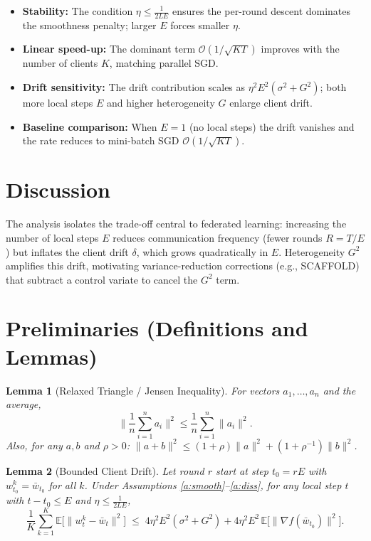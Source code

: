 \documentclass[11pt]{article}
\newtheorem{lemma}{Lemma}
\begin{document}
\begin{itemize}
\item \textbf{Stability:} The condition $\eta \le \tfrac{1}{2LE}$ ensures the
      per-round descent dominates the smoothness penalty; larger $E$ forces
      smaller $\eta$.
\item \textbf{Linear speed-up:} The dominant term $\mathcal{O}(1/\sqrt{KT})$
      improves with the number of clients $K$, matching parallel SGD.
\item \textbf{Drift sensitivity:} The drift contribution scales as
      $\eta^2 E^2 (\sigma^2 + G^2)$; both more local steps $E$ and higher
      heterogeneity $G$ enlarge client drift.
\item \textbf{Baseline comparison:} When $E=1$ (no local steps) the drift
      vanishes and the rate reduces to mini-batch SGD $\mathcal{O}(1/\sqrt{KT})$.
\end{itemize}

\section*{Discussion}
The analysis isolates the trade-off central to federated learning:
increasing the number of local steps $E$ reduces communication frequency
(fewer rounds $R = T/E$) but inflates the client drift $\delta$, which grows
quadratically in $E$. Heterogeneity $G^2$ amplifies this drift, motivating
variance-reduction corrections (e.g., SCAFFOLD) that subtract a control
variate to cancel the $G^2$ term.

\section*{Preliminaries (Definitions and Lemmas)}

\begin{lemma}[Relaxed Triangle / Jensen Inequality]\label{lem:jensen}
For vectors $a_1,\dots,a_n$ and the average,
\[
\Big\|\frac{1}{n}\sum_{i=1}^n a_i\Big\|^2
\le \frac{1}{n}\sum_{i=1}^n \|a_i\|^2.
\]
Also, for any $a,b$ and $\rho>0$:
$\|a+b\|^2 \le (1+\rho)\|a\|^2 + (1+\rho^{-1})\|b\|^2$.
\end{lemma}

\begin{lemma}[Bounded Client Drift]\label{lem:drift}
Let round $r$ start at step $t_0 = rE$ with $w_{t_0}^k = \bar w_{t_0}$ for all
$k$. Under Assumptions \ref{a:smooth}--\ref{a:diss}, for any local step
$t$ with $t - t_0 \le E$ and $\eta \le \tfrac{1}{2LE}$,
\[
\frac{1}{K}\sum_{k=1}^K \mathbb{E}\big[\|w_t^k - \bar w_t\|^2\big]
\;\le\; 4 \eta^2 E^2 (\sigma^2 + G^2)
        + 4\eta^2 E^2\,\mathbb{E}\big[\|\nabla f(\bar w_{t_0})\|^2\big].
\]
\end{lemma}
\end{document}
